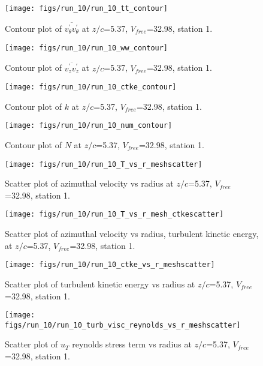 \begin{figure}[H]
\centering
\texttt{[image: figs/run\_10/run\_10\_tt\_contour]}
\caption{Contour plot of $\overline{v_{\theta}^{\prime} v_{\theta}^{\prime}}$ at $z/c$=5.37, $V_{free}$=32.98, station 1.}
\end{figure}


\begin{figure}[H]
\centering
\texttt{[image: figs/run\_10/run\_10\_ww\_contour]}
\caption{Contour plot of $\overline{v_{z}^{\prime} v_{z}^{\prime}}$ at $z/c$=5.37, $V_{free}$=32.98, station 1.}
\end{figure}


\begin{figure}[H]
\centering
\texttt{[image: figs/run\_10/run\_10\_ctke\_contour]}
\caption{Contour plot of $k$ at $z/c$=5.37, $V_{free}$=32.98, station 1.}
\end{figure}


\begin{figure}[H]
\centering
\texttt{[image: figs/run\_10/run\_10\_num\_contour]}
\caption{Contour plot of $N$ at $z/c$=5.37, $V_{free}$=32.98, station 1.}
\end{figure}


\begin{figure}[H]
\centering
\texttt{[image: figs/run\_10/run\_10\_T\_vs\_r\_meshscatter]}
\caption{Scatter plot of azimuthal velocity vs radius at $z/c$=5.37, $V_{free}$=32.98, station 1.}
\end{figure}


\begin{figure}[H]
\centering
\texttt{[image: figs/run\_10/run\_10\_T\_vs\_r\_mesh\_ctkescatter]}
\caption{Scatter plot of azimuthal velocity vs radius, turbulent kinetic energy, at $z/c$=5.37, $V_{free}$=32.98, station 1.}
\end{figure}


\begin{figure}[H]
\centering
\texttt{[image: figs/run\_10/run\_10\_ctke\_vs\_r\_meshscatter]}
\caption{Scatter plot of turbulent kinetic energy vs radius at $z/c$=5.37, $V_{free}$=32.98, station 1.}
\end{figure}


\begin{figure}[H]
\centering
\texttt{[image: figs/run\_10/run\_10\_turb\_visc\_reynolds\_vs\_r\_meshscatter]}
\caption{Scatter plot of $
u_T$ reynolds stress term vs radius at $z/c$=5.37, $V_{free}$=32.98, station 1.}
\end{figure}


